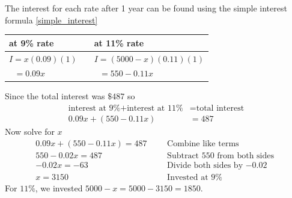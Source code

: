 The interest for each rate after 1 year can be found using the simple interest formula \eqref{simple_interest}
\begin{center}
\begin{tabular}{lcl}
    \toprule
    at 9\% rate   & &    at 11\% rate\\
    \hline 
    $I = x(0.09)(1)$ &  &    $I=(5000-x)(0.11)(1)$\\
    $\ \ \,= 0.09x$  & &  $\ \ \, =550-0.11x$ \\
    \bottomrule
\end{tabular}
\end{center}
Since the total interest was $\$487$ so
\begin{align*}
    \text{interest at 9\%} + \text{interest at 11\%} &= \text{total interest}\\
    0.09x + (550-0.11x) &= 487
\end{align*}
Now solve for $x$
\begin{align*}
        0.09x + (550-0.11x) = 487&   &   &\text{Combine like terms}\\
        550-0.02x=487&   &   &\text{Subtract 550 from both sides }\\
        -0.02x =-63& & &\text{Divide both sides by $-0.02$}\\
        x = 3150&   &   &\text{Invested at 9\%}
\end{align*}
For $11\%$, we invested $5000-x=5000-3150=1850$.
